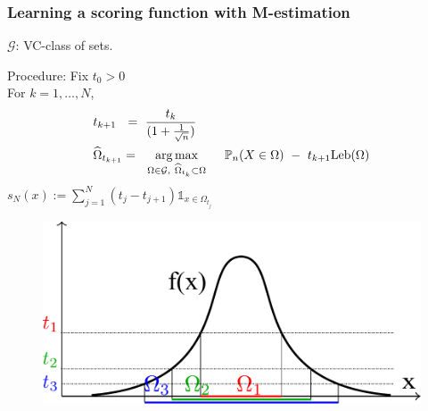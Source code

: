 \documentclass[9pt]{beamer}
\newcommand\blue{\color{blue} }
\def\argmax{\operatornamewithlimits{arg\,max}}
\def\leb{\text{Leb}}
\begin{document}
\begin{frame}
\frametitle{Learning a scoring function with M-estimation}




$\mathcal{G}$: VC-class of sets.

\begin{block}{}
{\blue Procedure}:  Fix $t_0 > 0$\\
For $k=1, \ldots, N$,
%
\begin{align*}
&t_{k+1} ~~=~ \frac{t_k}{(1 + \frac{1}{\sqrt n})}\\
&\widehat \Omega_{t_{k+1}} =~~ \argmax_{\Omega \in \mathcal{G},~ \widehat \Omega_{t_k} \subset \Omega } ~~~~ \mathbb{P}_n(X \in \Omega) ~-~ t_{k+1} \leb(\Omega)
\end{align*}
%
$s_N(x) := \sum_{j=1}^N(t_j - t_{j+1}) \mathds{1}_{x \in \Omega_{t_j}}$
\begin{figure}
\includegraphics[width=0.5\linewidth]{sourcefigs/em_optim.pdf}
\end{figure}
\end{block}

\end{frame}
\end{document}
